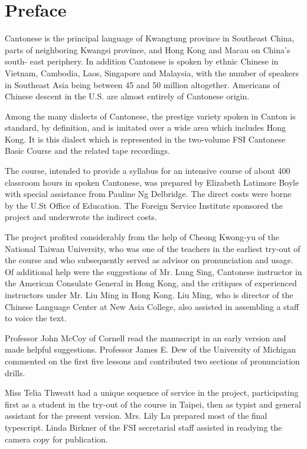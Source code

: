 \section{Preface}

Cantonese is the principal language of Kwangtung province in Southeast China, parts of neighboring Kwangsi province, and Hong Kong and Macau on China's south- east periphery. In addition Cantonese is spoken by ethnic Chinese in Vietnam, Cambodia, Laos, Singapore and Malaysia, with the number of speakers in Southeast Asia being between 45 and 50 million altogether. Americans of Chinese descent in the U.S. are almost entirely of Cantonese origin.

Among the many dialects of Cantonese, the prestige variety spoken in Canton is standard, by definition, and is imitated over a wide area which includes Hong Kong. It is this dialect which is represented in the two-volume FSI Cantonese Basic Course and the related tape recordings.

The course, intended to provide a syllabus for an intensive course of about 400 classroom hours in spoken Cantonese, was prepared by Elizabeth Latimore Boyle with special assistance from Pauline Ng Delbridge. The direct costs were borne by the U.St Office of Education. The Foreign Service Institute sponsored the project and underwrote the indirect costs.

The project profited considerably from the help of Cheong Kwong-yu of the National Taiwan University, who was one of the teachers in the earliest try-out of the course and who subsequently served as advisor on pronunciation and usage. Of additional help were the suggestions of Mr. Lung Sing, Cantonese instructor in the American Consulate General in Hong Kong, and the critiques of experienced instructors under Mr. Liu Ming in Hong Kong. Liu Ming, who is director of the Chinese Language Center at New Asia College, also assisted in assembling a staff to voice the text.

Professor John McCoy of Cornell read the manuscript in an early version and made helpful suggestions. Professor James E. Dew of the University of Michigan commented on the first five lessons and contributed two sections of pronunciation drills.

Miss Telia Thweatt had a unique sequence of service in the project, participating first as a student in the try-out of the course in Taipei, then as typist and general assistant for the present version. Mrs. Lily Lu prepared most of the final typescript. Linda Birkner of the FSI secretarial staff assisted in readying the camera copy for publication.

